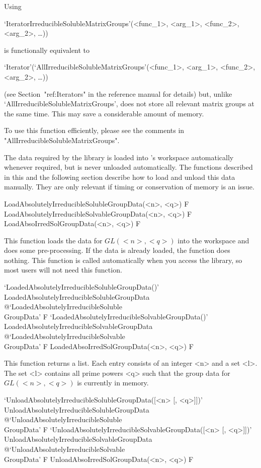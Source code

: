 Using 

`IteratorIrreducibleSolubleMatrixGroups'(<func_1>, <arg_1>, <func_2>, <arg_2>, \dots)) 

is functionally equivalent to 

`Iterator'(`AllIrreducibleSolubleMatrixGroups'(<func_1>, <arg_1>, <func_2>, <arg_2>, \dots))

(see Section~"ref:Iterators" in the {\GAP} reference manual for details) but, unlike `AllIrreducibleSolubleMatrixGroups', does not store all 
relevant matrix groups at the same time. This may save a considerable amount of memory. 

To use this function efficiently, please see the comments in 
"AllIrreducibleSolubleMatrixGroups".



The data required by the {\IRREDSOL} library is loaded into {\GAP}'s workspace automatically whenever required, but is never unloaded automatically. The functions described in this
and the following section describe how to load and unload this data manually. 
They are only relevant if timing or conservation of memory is an issue.

\>LoadAbsolutelyIrreducibleSolubleGroupData(<n>, <q>) F
\>LoadAbsolutelyIrreducibleSolvableGroupData(<n>, <q>) F
\>LoadAbsoIrredSolGroupData(<n>, <q>) F

This function loads the data for $GL(<n>, <q>)$ into the {\GAP} workspace and does 
some pre-processing. If the data is already loaded, the function does nothing. This 
function is called automatically when you access the
{\IRREDSOL} library, so most users  will not need this function.

\>`LoadedAbsolutelyIrreducibleSolubleGroupData()'%
{LoadedAbsolutelyIrreducibleSolubleGroupData}%
@{`LoadedAbsolutelyIrreducibleSoluble\\GroupData'} F
\>`LoadedAbsolutelyIrreducibleSolvableGroupData()'%
{LoadedAbsolutelyIrreducibleSolvableGroupData}%
@{`LoadedAbsolutelyIrreducibleSolvable\\GroupData'} F
\>LoadedAbsoIrredSolGroupData(<n>, <q>) F

This function returns a list. Each entry consists of an integer <n> and a set <l>. The set
<l> contains all prime powers <q> such that the group data for $GL(<n>, <q>)$ is currently in memory.

\>`UnloadAbsolutelyIrreducibleSolubleGroupData([<n> [, <q>]])'%
{UnloadAbsolutelyIrreducibleSolubleGroupData}%
@{`UnloadAbsolutelyIrreducibleSoluble\\GroupData'} F
\>`UnloadAbsolutelyIrreducibleSolvableGroupData([<n> [, <q>]])'%
{UnloadAbsolutelyIrreducibleSolvableGroupData}%
@{`UnloadAbsolutelyIrreducibleSolvable\\GroupData'} F
\>UnloadAbsoIrredSolGroupData(<n>, <q>) F

